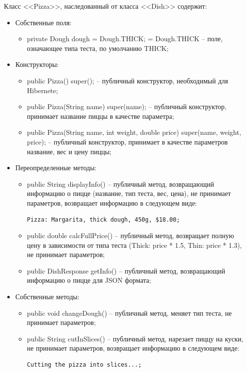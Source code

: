 \documentclass[a4paper,14pt]{extarticle}
\begin{document}
Класс <<Pizza>>, наследованный от класса <<Dish>> содержит:
\begin{itemize}
  \item[--] Собственные поля:
    \begin{itemize}
      \item[--] private Dough dough = Dough.THICK; = Dough.THICK -- поле, означающее типа теста, по умолчанию THICK;
    \end{itemize}
  \item[--] Конструкторы:
    \begin{itemize}
      \item[--] public Pizza() { super(); } -- публичный конструктор, необходимый для Hibernete;
      \item[--] public Pizza(String name) { super(name); } -- публичный конструктор, принимает название пиццы в качестве параметра;
      \item[--] public Pizza(String name, int weight, double price) { super(name, weight, price); } -- публичный конструктор, принимает в качестве параметров название, вес и цену пиццы;
    \end{itemize}
  \item[--] Переопределенные методы:
    \begin{itemize}
      \item[--] public String displayInfo() -- публичный метод, возвращающий информацию о пицце (название, тип теста, вес, цена), не принимает параметров, возвращает информацию в следующем виде:
      \begin{Verbatim}[tabsize=4]
        Pizza: Margarita, thick dough, 450g, $18.00;
      \end{Verbatim}
      \item[--] public double calcFullPrice() -- публичный метод, возвращает полную цену в зависимости от типа теста (Thick: price * 1.5, Thin: price * 1.3), не принимает параметров;
      \item[--] public DishResponse getInfo() -- публичный метод, возвращающий информацию о пицце для JSON формата;
    \end{itemize}
  \item[--] Собственные методы:
    \begin{itemize}
      \item[--] public void changeDough() -- публичный метод, меняет тип теста, не принимает параметров;
      \item[--] public String cutInSlices() -- публичный метод, нарезает пиццу на куски, не принимает параметров, возвращает информацию в следующем виде:
      \begin{Verbatim}[tabsize=4]
        Cutting the pizza into slices...;
      \end{Verbatim}
    \end{itemize}
\end{itemize}
\end{document}
